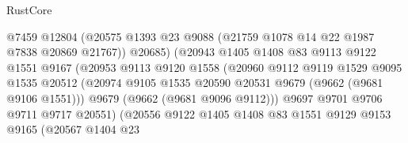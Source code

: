 \begin{lexlean}{RustCore}
\begin{coremodule}
                                      @7459
                                      @12804
                                      (@20575
                                        @1393
                                        @23
                                        @9088
                                        (@21759 @1078 @14 @22 @1987 @7838 @20869 @21767))
                                      @20685)
                                    (@20943
                                      @1405
                                      @1408
                                      @83
                                      @9113
                                      @9122
                                      @1551
                                      @9167
                                      (@20953
                                        @9113
                                        @9120
                                        @1558
                                        (@20960
                                          @9112
                                          @9119
                                          @1529
                                          @9095
                                          @1535
                                          @20512
                                          (@20974
                                            @9105
                                            @1535
                                            @20590
                                            @20531
                                            @9679
                                            (@9662 (@9681 @9106 @1551)))
                                          @9679
                                          (@9662 (@9681 @9096 @9112)))
                                        @9697
                                        @9701
                                        @9706
                                        @9711
                                        @9717
                                        @20551)
                                      (@20556
                                        @9122
                                        @1405
                                        @1408
                                        @83
                                        @1551
                                        @9129
                                        @9153
                                        @9165
                                        (@20567
                                          @1404
                                          @23

\end{coremodule}
\end{lexlean}

